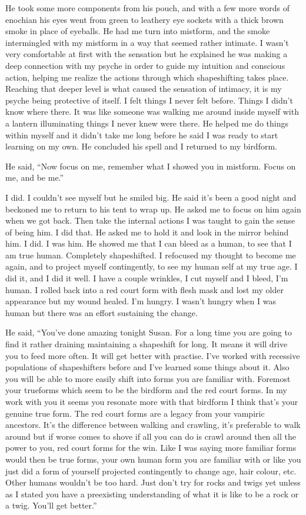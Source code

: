 He took some more components from his pouch, and with a few more words of enochian his eyes went from green to leathery eye sockets with a thick brown smoke in place of eyeballs. He had me turn into mistform, and the smoke intermingled with my mistform in a way that seemed rather intimate. I wasn't very comfortable at first with the sensation but he explained he was making a deep connection with my psyche in order to guide my intuition and conscious action, helping me realize the actions through which shapeshifting takes place. Reaching that deeper level is what caused the sensation of intimacy, it is my psyche being protective of itself. I felt things I never felt before. Things I didn't know where there. It was like someone was walking me around inside myself with a lantern illuminating things I never knew were there. He helped me do things within myself and it didn't take me long before he said I was ready to start learning on my own. He concluded his spell and I returned to my birdform.

He said, ``Now focus on me, remember what I showed you in mistform. Focus on me, and be me.''

I did. I couldn't see myself but he smiled big. He said it's been a good night and beckoned me to return to his tent to wrap up. He asked me to focus on him again when we got back. Then take the internal actions I was taught to gain the sense of being him. I did that. He asked me to hold it and look in the mirror behind him. I did. I was him. He showed me that I can bleed as a human, to see that I am true human. Completely shapeshifted. I refocused my thought to become me again, and to project myself contingently, to see my human self at my true age. I did it, and I did it well. I have a couple wrinkles, I cut myself and I bleed, I'm human. I rolled back into a red court form with flesh mask and lost my older appearance but my wound healed. I'm hungry. I wasn't hungry when I was human but there was an effort sustaining the change.

He said, ``You've done amazing tonight Susan. For a long time you are going to find it rather draining maintaining a shapeshift for long. It means it will drive you to feed more often. It will get better with practise. I've worked with recessive populations of shapeshifters before and I've learned some things about it. Also you will be able to more easily shift into forms you are familiar with. Foremost your trueforms which seem to be the birdform and the red court forms. In my work with you it seems you resonate more with that birdform I think that's your genuine true form. The red court forms are a legacy from your vampiric ancestors. It's the difference between walking and crawling, it's preferable to walk around but if worse comes to shove if all you can do is crawl around then all the power to you, red court forms for the win. Like I was saying more familiar forms would then be true forms, your own human form you are familiar with or like you just did a form of yourself projected contingently to change age, hair colour, etc. Other humans wouldn't be too hard. Just don't try for rocks and twigs yet unless as I stated you have a preexisting understanding of what it is like to be a rock or a twig. You'll get better.''

